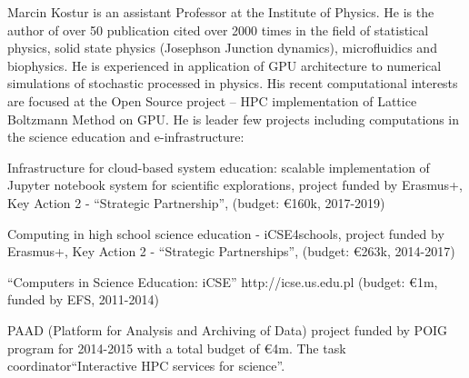 \begin{participant}[type=leadPI,PM=3,gender=male]{Marcin Kostur}
is an assistant Professor at the Institute of Physics. He is the author of over 50
publication cited over 2000 times in the field of statistical physics,
solid state physics (Josephson Junction dynamics), microfluidics and
biophysics. He is experienced in application of GPU architecture to
numerical simulations of stochastic processed in physics. His recent
computational interests are focused at the Open Source project
 -- HPC implementation of Lattice Boltzmann Method on GPU.
He is leader few projects including  computations in the science education and e-infrastructure:
\begin{compactitem}
\item Infrastructure for cloud-based system education: scalable implementation of Jupyter notebook system for scientific explorations, project funded by Erasmus+, Key Action 2 - ``Strategic Partnership'', (budget: \euro{160}k, 2017-2019)
\item Computing in high school science education - iCSE4schools,
  project funded by Erasmus+, Key Action 2 - ``Strategic Partnerships'',
  (budget: \euro{263}k, 2014-2017)
\item ``Computers in Science Education: iCSE'' http://icse.us.edu.pl
  (budget: \euro{1}m, funded by EFS, 2011-2014)
  
  \item  PAAD (Platform for Analysis and Archiving of Data) project funded by POIG program for 2014-2015 with a total budget
  of \euro{4}m. The task coordinator``Interactive HPC services for science''. 
\end{compactitem}
\end{participant}
